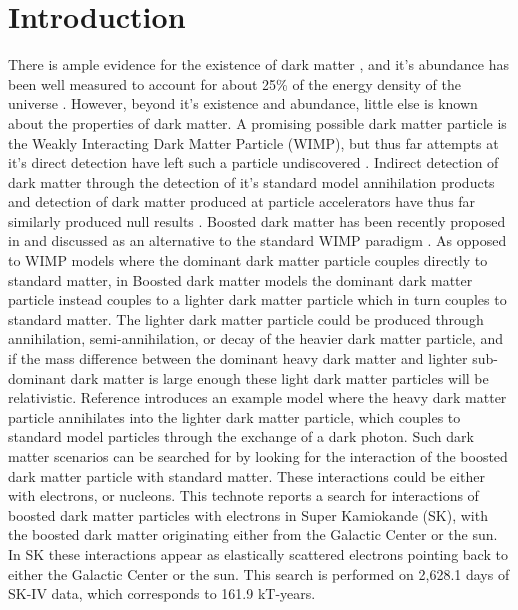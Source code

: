 \section{Introduction}
\label{sec:motivation}
There is ample evidence for the existence of dark matter \cite{Zwicky:1933gu,Rubin:1980dm,Begeman:1991iy,Blumenthal:1984eu}, and it's abundance has been well measured to account for about 25\% of the energy density of the universe \cite{PlanckCollaboration:2016cf,Hinshaw:2013dd}.  However, beyond it's existence and abundance, little else is known about the properties of dark matter.  A promising possible dark matter particle is the Weakly Interacting Dark Matter Particle (WIMP), but thus far attempts at it's direct detection have left such a particle undiscovered \cite{Collaboration:2013vx,TheCDMSIICollaboration:2010dr,Aprile:2012kx}.  Indirect detection of dark matter through the detection of it's standard model annihilation products and detection of dark matter produced at particle accelerators have thus far similarly produced null results \cite{Desai:2004pq,Rameez:2015nvz,Adrian-Martinez:2013ayv,Khachatryan:2014rra,Aad:2015zva,Goodman:2010ku}.  
Boosted dark matter has been recently proposed in \cite{Agashe:2014yua} and discussed as an alternative to the standard WIMP paradigm \cite{Cherry:2015gw,Bhattacharya:2014yha,Kopp:2015gp,Kong:2015jb,Berger:2014hq}.   As opposed to WIMP models where the dominant dark matter particle couples directly to standard matter, in Boosted dark matter models the dominant dark matter particle instead couples to a lighter dark matter particle which in turn couples to standard matter.  The lighter dark matter particle could be produced through annihilation, semi-annihilation, or decay of the heavier dark matter particle, and if the mass difference between the dominant heavy dark matter and lighter sub-dominant dark matter is large enough these light dark matter particles will be relativistic.  Reference \cite{Agashe:2014yua} introduces an example model where the heavy dark matter particle annihilates into the lighter dark matter particle, which couples to standard model particles through the exchange of a dark photon.
Such dark matter scenarios can be searched for by looking for the interaction of the boosted dark matter particle with standard matter.  These interactions could be either with electrons, or nucleons.  This technote reports a search for interactions of boosted dark matter particles with electrons in Super Kamiokande (SK), with the boosted dark matter originating either from the Galactic Center or the sun.  In SK these interactions appear as elastically scattered electrons pointing back to either the Galactic Center or the sun.  This search is performed on 2,628.1 days of SK-IV data, which corresponds to 161.9 kT-years. 





